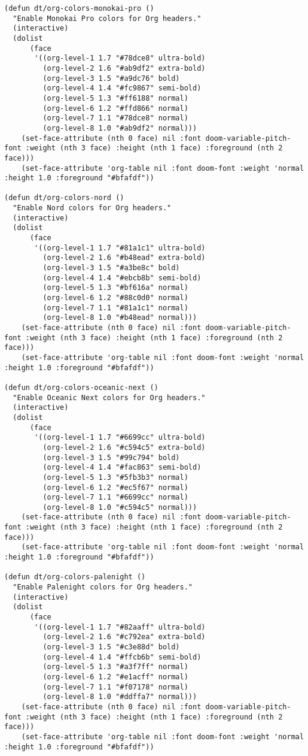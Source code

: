 \documentclass[11pt]{article}
\begin{document}
\begin{verbatim}
(defun dt/org-colors-monokai-pro ()
  "Enable Monokai Pro colors for Org headers."
  (interactive)
  (dolist
      (face
       '((org-level-1 1.7 "#78dce8" ultra-bold)
         (org-level-2 1.6 "#ab9df2" extra-bold)
         (org-level-3 1.5 "#a9dc76" bold)
         (org-level-4 1.4 "#fc9867" semi-bold)
         (org-level-5 1.3 "#ff6188" normal)
         (org-level-6 1.2 "#ffd866" normal)
         (org-level-7 1.1 "#78dce8" normal)
         (org-level-8 1.0 "#ab9df2" normal)))
    (set-face-attribute (nth 0 face) nil :font doom-variable-pitch-font :weight (nth 3 face) :height (nth 1 face) :foreground (nth 2 face)))
    (set-face-attribute 'org-table nil :font doom-font :weight 'normal :height 1.0 :foreground "#bfafdf"))

(defun dt/org-colors-nord ()
  "Enable Nord colors for Org headers."
  (interactive)
  (dolist
      (face
       '((org-level-1 1.7 "#81a1c1" ultra-bold)
         (org-level-2 1.6 "#b48ead" extra-bold)
         (org-level-3 1.5 "#a3be8c" bold)
         (org-level-4 1.4 "#ebcb8b" semi-bold)
         (org-level-5 1.3 "#bf616a" normal)
         (org-level-6 1.2 "#88c0d0" normal)
         (org-level-7 1.1 "#81a1c1" normal)
         (org-level-8 1.0 "#b48ead" normal)))
    (set-face-attribute (nth 0 face) nil :font doom-variable-pitch-font :weight (nth 3 face) :height (nth 1 face) :foreground (nth 2 face)))
    (set-face-attribute 'org-table nil :font doom-font :weight 'normal :height 1.0 :foreground "#bfafdf"))

(defun dt/org-colors-oceanic-next ()
  "Enable Oceanic Next colors for Org headers."
  (interactive)
  (dolist
      (face
       '((org-level-1 1.7 "#6699cc" ultra-bold)
         (org-level-2 1.6 "#c594c5" extra-bold)
         (org-level-3 1.5 "#99c794" bold)
         (org-level-4 1.4 "#fac863" semi-bold)
         (org-level-5 1.3 "#5fb3b3" normal)
         (org-level-6 1.2 "#ec5f67" normal)
         (org-level-7 1.1 "#6699cc" normal)
         (org-level-8 1.0 "#c594c5" normal)))
    (set-face-attribute (nth 0 face) nil :font doom-variable-pitch-font :weight (nth 3 face) :height (nth 1 face) :foreground (nth 2 face)))
    (set-face-attribute 'org-table nil :font doom-font :weight 'normal :height 1.0 :foreground "#bfafdf"))

(defun dt/org-colors-palenight ()
  "Enable Palenight colors for Org headers."
  (interactive)
  (dolist
      (face
       '((org-level-1 1.7 "#82aaff" ultra-bold)
         (org-level-2 1.6 "#c792ea" extra-bold)
         (org-level-3 1.5 "#c3e88d" bold)
         (org-level-4 1.4 "#ffcb6b" semi-bold)
         (org-level-5 1.3 "#a3f7ff" normal)
         (org-level-6 1.2 "#e1acff" normal)
         (org-level-7 1.1 "#f07178" normal)
         (org-level-8 1.0 "#ddffa7" normal)))
    (set-face-attribute (nth 0 face) nil :font doom-variable-pitch-font :weight (nth 3 face) :height (nth 1 face) :foreground (nth 2 face)))
    (set-face-attribute 'org-table nil :font doom-font :weight 'normal :height 1.0 :foreground "#bfafdf"))


\end{verbatim}
\end{document}
